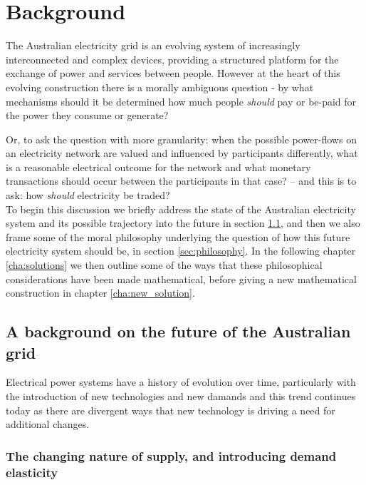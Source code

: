 \chapter{Background}
\label{cha:background}

The Australian electricity grid is an evolving system of increasingly interconnected and complex devices, providing a structured platform for the exchange of power and services between people.
However at the heart of this evolving construction there is a morally ambiguous question - by what mechanisms should it be determined how much people \textit{should} pay or be-paid for the power they consume or generate?

Or, to ask the question with more granularity: when the possible power-flows on an electricity network are valued and influenced by participants differently, 
what is a reasonable electrical outcome for the network and what monetary transactions should occur between the participants in that case? -- and this is to ask: how \textit{should} electricity be traded?\\

To begin this discussion we briefly address the state of the Australian electricity system and its possible trajectory into the future in section \ref{sec:electricity_system},
and then we also frame some of the moral philosophy underlying the question of how this future electricity system should be, in section \ref{sec:philosophy}.
In the following chapter \ref{cha:solutions} we then outline some of the ways that these philosophical considerations have been made mathematical, before giving a new mathematical construction in chapter \ref{cha:new_solution}.

\section{A background on the future of the Australian grid}\label{sec:electricity_system}

Electrical power systems have a history of evolution over time, particularly with the introduction of new technologies and new damands and this trend continues today as there are divergent ways that new technology is driving a need for additional changes.

\subsection{The changing nature of supply, and introducing demand elasticity}

